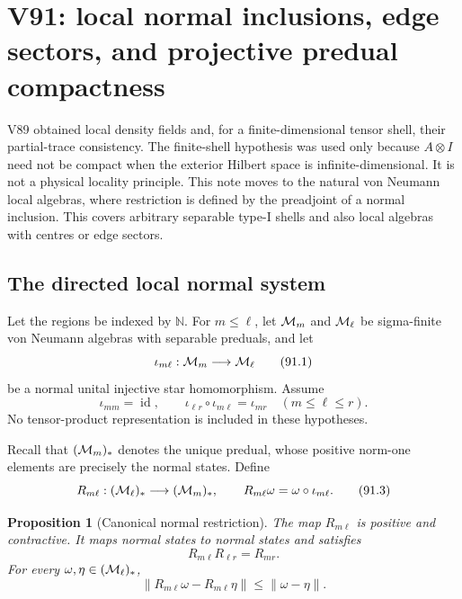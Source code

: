 \documentclass[11pt]{article}
\newtheorem{proposition}[theorem]{Proposition}
\theoremstyle{remark}
\begin{document}


\section{V91: local normal inclusions, edge sectors, and projective
predual compactness}
\label{sec:v12v91}

V89 obtained local density fields and, for a finite-dimensional
tensor shell, their partial-trace consistency.  The finite-shell
hypothesis was used only because \(A\otimes I\) need not be compact
when the exterior Hilbert space is infinite-dimensional.  It is not
a physical locality principle.  This note moves to the natural
von Neumann local algebras, where restriction is defined by the
preadjoint of a normal inclusion.  This covers arbitrary separable
type-I shells and also local algebras with centres or edge sectors.

\subsection{The directed local normal system}

Let the regions be indexed by \(\mathbb N\).  For \(m\leq\ell\), let
\({\cal M}_m\) and \({\cal M}_\ell\) be sigma-finite von Neumann
algebras with separable preduals, and let
\[
 \iota_{m\ell}:{\cal M}_m\longrightarrow{\cal M}_\ell             \tag{91.1}
\]
be a normal unital injective star homomorphism.  Assume
\[
 \iota_{mm}=\operatorname{id},\qquad
 \iota_{\ell r}\circ\iota_{m\ell}=\iota_{mr}
 \quad(m\leq\ell\leq r).                                          \tag{91.2}
\]
No tensor-product representation is included in these hypotheses.

Recall that \(({\cal M}_m)_*\) denotes the unique predual, whose
positive norm-one elements are precisely the normal states.  Define
\[
 R_{m\ell}:({\cal M}_\ell)_*\longrightarrow({\cal M}_m)_*,
 \qquad R_{m\ell}\omega=\omega\circ\iota_{m\ell}.                  \tag{91.3}
\]

\begin{proposition}[Canonical normal restriction]
\label{prop:v12v91-restriction}
The map \(R_{m\ell}\) is positive and contractive.  It maps normal
states to normal states and satisfies
\[
 R_{m\ell}R_{\ell r}=R_{mr}.                                      \tag{91.4}
\]
For every \(\omega,\eta\in({\cal M}_\ell)_*\),
\[
 \|R_{m\ell}\omega-R_{m\ell}\eta\|
 \leq \|\omega-\eta\|.                                           \tag{91.5}
\]
\end{proposition}
\end{document}
